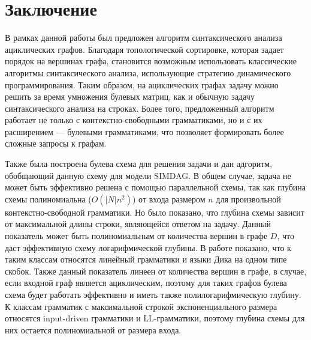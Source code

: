 \documentclass{spbau-diploma}
\begin{document}
\section*{Заключение}
В рамках данной работы был предложен алгоритм синтаксического анализа ациклических графов. Благодаря топологической сортировке, которая задает порядок на вершинах графа, становится возможным использовать классические алгоритмы синтаксического анализа, использующие стратегию динамического программирования. Таким образом, на ациклических графах задачу можно решить за время умножения булевых матриц, как и обычную задачу синтаксического анализа на строках. Более того, предложенный алгоритм работает не только с контекстно-свободными грамматиками, но и с их расширением --- булевыми грамматиками, что позволяет формировать более сложные запросы к графам.\par
Также была построена булева схема для решения задачи и дан адгоритм, обобщающий данную схему для модели SIMDAG. В общем случае, задача не может быть эффективно решена с помощью параллельной схемы, так как глубина схемы полиномиальна ($O(|N|n^2)$) от входа размером $n$ для произвольной контекстно-свободной грамматики. Но было показано, что глубина схемы зависит от максимальной длины строки, являющейся ответом на задачу. Данный показатель может быть полиномиальным от количества вершин в графе $D$, что даст эффективную схему логарифмической глубины. В работе показано, что к таким классам относятся линейный грамматики и языки Дика на одном типе скобок. Также данный показатель линеен от количества вершин в графе, в случае, если входной граф является ациклическим, поэтому для таких графов булева схема будет работать эффективно и иметь также полилогарифмическую глубину. К классам грамматик с максимальной строкой экспоненциального размера относятся input-driven грамматики и LL-грамматики, поэтому глубина схемы для них остается полиномиальной от размера входа.



\end{document}
